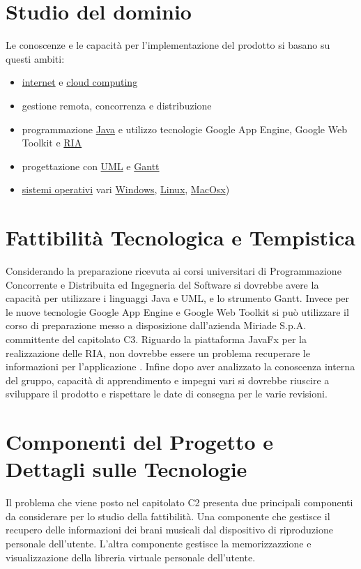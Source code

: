 \section{Studio del dominio} 
Le conoscenze e le capacit\`a per l'implementazione del prodotto si basano su
questi ambiti:
\begin{itemize}
  \item \underline{internet} e \underline{cloud computing}
  \item gestione remota, concorrenza e distribuzione
  \item programmazione \underline{Java} e utilizzo tecnologie Google App
  Engine, Google Web Toolkit e \underline{RIA}
  \item progettazione con \underline{UML} e \underline{Gantt}
  \item \underline{sistemi operativi} vari \underline{Windows},
  \underline{Linux}, \underline{MacOsx})
\end{itemize}

\section{Fattibilit\`a Tecnologica e Tempistica}
Considerando la preparazione ricevuta ai corsi universitari di Programmazione
Concorrente e Distribuita ed Ingegneria del Software si dovrebbe avere la
capacit\`a per utilizzare i linguaggi Java e UML, e lo
strumento Gantt. Invece per le nuove tecnologie Google
App Engine e Google Web Toolkit si pu\`o utilizzare il corso di
preparazione messo a disposizione dall'azienda Miriade S.p.A. committente del
capitolato C3. Riguardo la piattaforma JavaFx per la realizzazione
delle RIA, non dovrebbe essere un problema recuperare le
informazioni per l'applicazione . Infine dopo aver analizzato la conoscenza interna del gruppo, capacit\`a di apprendimento e impegni vari si dovrebbe riuscire a sviluppare il prodotto e rispettare le date di consegna per le varie revisioni.

\section{Componenti del Progetto e Dettagli sulle Tecnologie}
Il problema che viene posto nel capitolato C2 presenta due principali componenti
da considerare per lo studio della fattibilit\`a. Una componente che gestisce il
recupero delle informazioni dei brani musicali dal dispositivo di riproduzione personale dell'utente.
L'altra componente gestisce la memorizzazzione e visualizzazione della libreria virtuale personale 
dell'utente.

